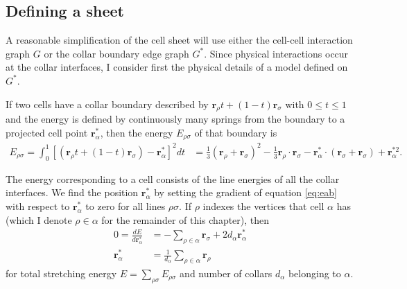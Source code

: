 \subsection{Defining a sheet} \label{subsec:springs}

A reasonable simplification of the cell sheet will use either the cell-cell interaction graph $G$ or the collar boundary edge graph $G^*$. 
Since physical interactions occur at the collar interfaces, I consider first the physical details of a model defined on $G^*$. 

If two cells have a collar boundary described by $\bm{r}_\rho t + (1-t)\bm{r}_\sigma$ with $0 \leq t \leq 1$ and the energy is defined by continuously many springs from the boundary to a projected cell point $\bm{r}^*_\alpha$, then the energy $E_{\rho\sigma}$ of that boundary is 
 \begin{align}
     E_{\rho\sigma} = \int_0^1 \left[(\bm{r}_\rho t + (1-t)\bm{r}_\sigma) - \bm{r}^*_\alpha \right]^2 dt &= \frac{1}{3} (\bm{r}_\rho + \bm{r}_\sigma)^2 - \frac{1}{3} \bm{r}_\rho\cdot\bm{r}_\sigma - \bm{r}^*_\alpha \cdot (\bm{r}_\sigma + \bm{r}_\sigma) + \bm{r}^{*2}_\alpha. \label{eq:eab}
 \end{align}

The energy corresponding to a cell consists of the line energies of all the collar interfaces. 
We find the position $\bm{r}^*_\alpha$ by setting the gradient of equation \ref{eq:eab} with respect to $\bm{r}^*_\alpha$ to zero for all lines $\rho\sigma$. 
If $\rho$ indexes the vertices that cell $\alpha$ has (which I denote $\rho\in\alpha$ for the remainder of this chapter), then 
\begin{align*}
    0 = \frac{dE}{d\bm{r}^*_\alpha} &= -\sum_{\rho\in\alpha} \bm{r}_\sigma + 2d_\alpha\bm{r}^*_\alpha \\
    \bm{r}^*_\alpha &= \frac{1}{d_\alpha} \sum_{\rho\in\alpha} \bm{r}_\rho
\end{align*}
\noindent for total stretching energy $E = \sum_{\rho\sigma}E_{\rho\sigma}$ and number of collars $d_\alpha$ belonging to $\alpha$.


